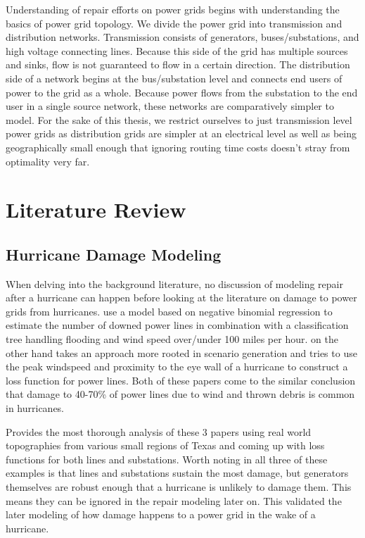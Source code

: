 \documentclass{article}
\begin{document}
	Understanding of repair efforts on power grids begins with understanding the basics of power grid topology. We divide the power grid into transmission and distribution networks. Transmission consists of generators, buses/substations, and high voltage connecting lines. Because this side of the grid has multiple sources and sinks, flow is not guaranteed to flow in a certain direction. The distribution side of a network begins at the bus/substation level and connects end users of power to the grid as a whole. Because power flows from the substation to the end user in a single source network, these networks are comparatively simpler to model. For the sake of this thesis, we restrict ourselves to just transmission level power grids as distribution grids are simpler at an electrical level as well as being geographically small enough that ignoring routing time costs doesn't stray from optimality very far.
	
	
	\section{Literature Review}
	\subsection{Hurricane Damage Modeling}
		When delving into the background literature, no discussion of modeling repair after a hurricane can happen before looking at the literature on damage to power grids from hurricanes. \cite{GuikemaEA2010} use a model based on negative binomial regression to estimate the number of downed power lines in combination with a classification tree handling flooding and wind speed over/under 100 miles per hour. \cite{ScherbEA2015} on the other hand takes an approach more rooted in scenario generation and tries to use the peak windspeed and proximity to the eye wall of a hurricane to construct a loss function for power lines. Both of these papers come to the similar conclusion that damage to 40-70\% of power lines due to wind and thrown debris is common in hurricanes.
		
		 \cite{WinklerEA2010} Provides the most thorough analysis of these 3 papers using real world topographies from various small regions of Texas and coming up with loss functions for both lines and substations. Worth noting in all three of these examples is that lines and substations sustain the most damage, but generators themselves are robust enough that a hurricane is unlikely to damage them. This means they can be ignored in the repair modeling later on. This validated the later modeling of how damage happens to a power grid in the wake of a hurricane.
\end{document}
